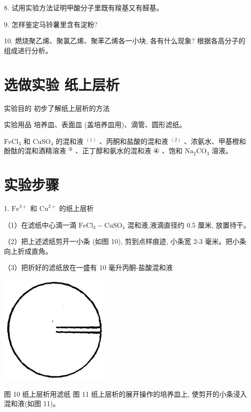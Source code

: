 \documentclass[10pt]{article}
\begin{document}
8. 试用实验方法证明甲酸分子里既有羧基又有醛基。

9. 怎样鉴定马铃薯里含有淀粉?

10. 燃烧聚乙烯、聚氯乙烯、聚苯乙烯各一小块, 各有什么现象? 根据各高分子的组成进行分析。

\section*{选做实验 纸上层析}

实验目的 初步了解纸上层析的方法

实验用品 培养皿、表面皿 (盖培养皿用)、滴管、圆形滤纸。

\({\mathrm{{FeCl}}}_{3}\) 和 \({\mathrm{{CuSO}}}_{4}\) 的混和液 \({}^{\left( 1\right) }\) 、丙酮和盐酸的混和液 \({}^{\left( 2\right) }\) 、浓氨水、甲基橙和酚酞的混和酒精溶液 \({}^{\text{③}}\) 、正丁醇和氨水的混和液 \(\text{④}\) 、饱和 \({\mathrm{{Na}}}_{2}{\mathrm{{CO}}}_{3}\) 溶液。

\section*{实验步骤}

1. \({\mathrm{{Fe}}}^{3 + }\) 和 \({\mathrm{{Cu}}}^{2 + }\) 的纸上层析

（1）在滤纸中心滴一滴 \({\mathrm{{FeCl}}}_{3} - {\mathrm{{CuSO}}}_{4}\) 混和液,液滴直径约 0.5 厘米, 放置待干。

（2）把上述滤纸剪开一小条 (如图 10), 剪到点样痕迹, 小条宽 2-3 毫米。把小条向上折成直角。

（3）把折好的滤纸放在一盛有 10 毫升丙酮-盐酸混和液

\begin{center}
\includegraphics[max width=0.4\textwidth]{images/01912d16-be99-77bb-9535-4f3ed8d9946f_228_419751.jpg}
\end{center}

图 10 纸上层析用滤纸 图 11 纸上层析的展开操作的培养皿上, 使剪开的小条浸入混和液(如图 11)。
\end{document}

